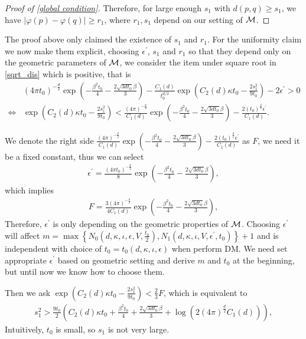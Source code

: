\begin{proof}[Proof of \cref{global condition}]
	Therefore, for large enough $s_1$ with $d(p,q)\geq s_1$, we have $|\varphi(p)-\varphi(q)|\geq r_1$, where $r_1, s_1$ depend on our
	setting of $\mathcal{M}$.
\end{proof}

The proof above only claimed the existence of $s_1$ and $r_1$. For the uniformity claim we now make them explicit, choosing $\epsilon^\prime$, $s_1$ and $r_1$ so that they depend only on the geometric parameters of $\mathcal{M}$, we consider the item under square root in \cref{sqrt_dis} which is positive, that is
\begin{align}
	&(4\pi t_0)^{-\frac{d}{2}} \exp\left(-\frac{\beta^2t_0}{4}-\frac{2\sqrt{3dt_0}\beta}{3}\right) - \frac{C_1(d)}{t_0^{d/2}}\exp\left(C_2(d)\kappa t_0 - \frac{2s_1^2}{9t_0}\right) - 2\epsilon^\prime > 0 \\
	\iff&  \exp\left(C_2(d)\kappa t_0 - \frac{2s_1^2}{9t_0}\right)< \frac{(4\pi)^{-\frac{d}{2}}}{C_1(d)} \exp\left(-\frac{\beta^2t_0}{4}-\frac{2\sqrt{3dt_0}\beta}{3}\right) - \frac{2(t_0)^\frac{d}{2}\epsilon^\prime}{C_1(d)}.
\end{align}

We denote the right side $\frac{(4\pi)^{-\frac{d}{2}}}{C_1(d)} \exp\left(-\frac{\beta^2t_0}{4}-\frac{2\sqrt{3dt_0}\beta}{3}\right) - \frac{2(t_0)^\frac{d}{2}\epsilon^\prime}{C_1(d)}$ as $F$, we need it be a fixed constant, thus we can select 
\begin{align}
	\label{sele eprime}
	\epsilon^\prime=\frac{(4\pi t_0)^{-\frac{d}{2}}}{8}\exp\left(-\frac{\beta^2t_0}{4}-\frac{2\sqrt{3dt_0}\beta}{3}\right),
\end{align}
which implies
\begin{align}
	F= \frac{3(4\pi)^{-\frac{d}{2}}}{4C_1(d)} \exp\left(-\frac{\beta^2t_0}{4}-\frac{2\sqrt{3dt_0}\beta}{3}\right),
\end{align}
Therefore, $\epsilon^\prime$ is only depending on the geometric properties of $\mathcal{M}$. Choosing $\epsilon^\prime$ will affect $m=\max\left\{N_0(d,\kappa,\iota,\epsilon,V,\frac{t_0}{2}),N_1(d,\kappa,\iota,V,\epsilon^\prime,t_0)\right\}+1$ and is independent with choice of $t_0=t_0(d,\kappa,\iota,\epsilon)$ when perform DM. We need set appropriate $\epsilon^\prime$ based on geometric setting and derive $m$ and $t_0$ at the beginning, but until now we know how to choose them.

Then we ask $\exp\left(C_2(d)\kappa t_0 - \frac{2s_1^2}{9t_0}\right) < \frac{2}{3}F$, which is equivalent to
\begin{align}
	s_1^2>\frac{9t_0}{2}\left(C_2(d)\kappa t_0 + \frac{\beta^2 t_0}{4}+\frac{2\sqrt{3d t_0}\beta}{3}+ \log\left(2(4\pi)^\frac{d}{2}C_1(d)\right)\right), \label{smallests1}
\end{align}
Intuitively, $t_0$ is small, so $s_1$ is not very large.


